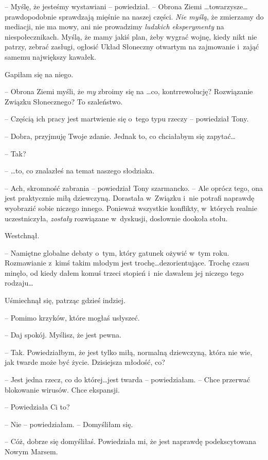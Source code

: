 \documentclass[oneside,polish,11pt,sfheadings]{mwbk}
\begin{document}
-- Myślę, że jesteśmy wystawiani -- powiedział. -- Obrona Ziemi \ldots towarzysze\ldots  prawdopodobnie sprawdzają mięśnie na naszej części.
\textit{Nie myślą}, że zmierzamy do mediacji, nie ma mowy, ani nie
prowadzimy \textit{ludzkich eksperymenty} na niespołecznikach. Myślą, że
mamy jakiś plan, żeby wygrać wojnę, kiedy nikt nie patrzy, zebrać
zasługi, ogłosić Układ Słoneczny otwartym na zajmowanie i~zająć samemu
największy kawałek.

Gapiłam się na niego. 

-- Obrona Ziemi myśli, że \textit{my} zbroimy się na
\ldots  co, kontrrewolucję? Rozwiązanie Związku Słonecznego? To szaleństwo.

-- Częścią ich pracy jest martwienie się o~tego typu rzeczy -- powiedział
Tony.

-- Dobra, przyjmuję Twoje zdanie. Jednak to, co chciałabym się zapytać\ldots 

-- Tak?

-- \ldots  to, co znalazłeś na temat naszego słodziaka.

-- Ach, skromność zabrania -- powiedział Tony szarmancko. -- Ale oprócz
tego, ona jest praktycznie miłą dziewczyną. Dorastała w~Związku i~nie
potrafi naprawdę wyobrazić sobie niczego innego. Ponieważ wszystkie
konflikty, w~których realnie uczestniczyła, \textit{zostały} rozwiązane w~dyskusji, dosłownie dookoła stołu.

Westchnął. 

-- Namiętne globalne debaty o~tym, który gatunek ożywić w~tym roku. Rozmawianie z~kimś takim młodym jest trochę\ldots  dezorientujące.
Trochę czasu minęło, od kiedy dałem komuś trzeci stopień i~nie dawałem
jej niczego tego rodzaju\ldots 

Uśmiechnął się, patrząc gdzieś indziej.

-- Pomimo krzyków, które mogłaś usłyszeć.

-- Daj spokój. Myślisz, że jest pewna.

-- Tak. Powiedziałbym, że jest tylko miłą, normalną dziewczyną, która nie
wie, jak twarde może być życie. Dzisiejsza młodość, co?

-- Jest jedna rzecz, co do której\ldots  jest twarda -- powiedziałam. -- Chce
przerwać blokowanie wirusów. Chce ekspansji.

-- Powiedziała Ci to?

-- Nie -- powiedziałam. -- Domyśliłam się.

-- Cóż, dobrze się domyśliłaś. Powiedziała mi, że jest naprawdę
podekscytowana Nowym Marsem.
\end{document}
